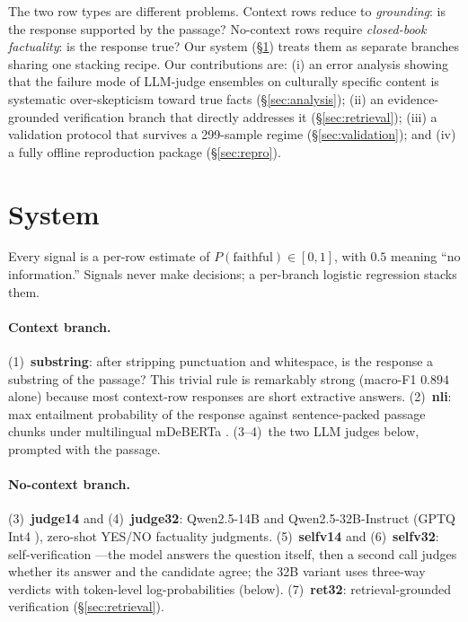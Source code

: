 \documentclass[11pt]{article}
\begin{document}
The two row types are different problems. Context rows reduce to
\emph{grounding}: is the response supported by the passage? No-context rows
require \emph{closed-book factuality}: is the response true? Our system
(\S\ref{sec:system}) treats them as separate branches sharing one stacking
recipe. Our contributions are: (i) an error analysis showing that the failure
mode of LLM-judge ensembles on culturally specific content is systematic
over-skepticism toward true facts (\S\ref{sec:analysis}); (ii) an
evidence-grounded verification branch that directly addresses it
(\S\ref{sec:retrieval}); (iii) a validation protocol that survives a
299-sample regime (\S\ref{sec:validation}); and (iv) a fully offline
reproduction package (\S\ref{sec:repro}).

\section{System}
\label{sec:system}

Every signal is a per-row estimate of $P(\text{faithful}) \in [0,1]$, with
$0.5$ meaning ``no information.'' Signals never make decisions; a per-branch
logistic regression stacks them.

\paragraph{Context branch.}
(1)~\textbf{substring}: after stripping punctuation and whitespace, is the
response a substring of the passage? This trivial rule is remarkably strong
(macro-F1 $0.894$ alone) because most context-row responses are short
extractive answers. (2)~\textbf{nli}: max entailment probability of the
response against sentence-packed passage chunks under multilingual mDeBERTa
\cite{laurer2022}. (3--4)~the two LLM judges below, prompted with the passage.

\paragraph{No-context branch.}
(3)~\textbf{judge14} and (4)~\textbf{judge32}: Qwen2.5-14B and
Qwen2.5-32B-Instruct \cite{qwen2.5} (GPTQ Int4 \cite{frantar2023gptq}),
zero-shot YES/NO factuality judgments. (5)~\textbf{selfv14} and
(6)~\textbf{selfv32}: self-verification \cite{manakul2023selfcheckgpt}---the
model answers the question itself, then a second call judges whether its
answer and the candidate agree; the 32B variant uses three-way verdicts with
token-level log-probabilities (below). (7)~\textbf{ret32}: retrieval-grounded
verification (\S\ref{sec:retrieval}).
\end{document}

